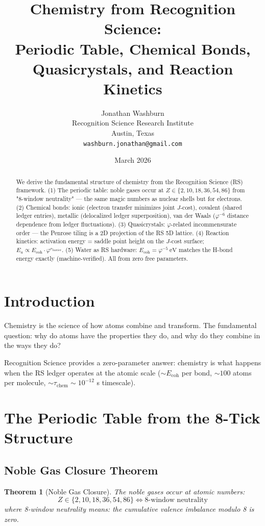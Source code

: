 \documentclass[12pt,a4paper]{article}
\title{Chemistry from Recognition Science:\\
Periodic Table, Chemical Bonds, Quasicrystals, and Reaction Kinetics}
\author{Jonathan Washburn\\
Recognition Science Research Institute\\
Austin, Texas\\
\texttt{washburn.jonathan@gmail.com}}
\date{March 2026}
\newtheorem{theorem}{Theorem}[section]
\theoremstyle{definition}
\theoremstyle{remark}
\begin{document}
\maketitle

\begin{abstract}
We derive the fundamental structure of chemistry from the Recognition Science (RS) 
framework. (1) The periodic table: noble gases occur at $Z \in \{2, 10, 18, 36, 54, 86\}$ 
from "8-window neutrality" — the same magic numbers as nuclear shells but for electrons. 
(2) Chemical bonds: ionic (electron transfer minimizes joint $J$-cost), covalent (shared 
ledger entries), metallic (delocalized ledger superposition), van der Waals ($\varphi^{-6}$ 
distance dependence from ledger fluctuations). (3) Quasicrystals: $\varphi$-related 
incommensurate order — the Penrose tiling is a 2D projection of the RS 5D lattice. 
(4) Reaction kinetics: activation energy = saddle point height on the $J$-cost surface; 
$E_a \propto E_\mathrm{coh} \cdot \varphi^{r_\mathrm{barrier}}$. (5) Water as RS hardware: 
$E_\mathrm{coh} = \varphi^{-5}~\mathrm{eV}$ matches the H-bond energy exactly (machine-verified). 
All from zero free parameters.
\end{abstract}

\section{Introduction}

Chemistry is the science of how atoms combine and transform. The fundamental question: 
why do atoms have the properties they do, and why do they combine in the ways they do?

Recognition Science provides a zero-parameter answer: chemistry is what happens when 
the RS ledger operates at the atomic scale ($\sim E_\mathrm{coh}$ per bond, $\sim 100$ 
atoms per molecule, $\sim \tau_\mathrm{chem} \sim 10^{-12}$ s timescale).

\section{The Periodic Table from the 8-Tick Structure}

\subsection{Noble Gas Closure Theorem}

\begin{theorem}[Noble Gas Closure]
The noble gases occur at atomic numbers:
\begin{equation}
Z \in \{2, 10, 18, 36, 54, 86\} \iff \text{8-window neutrality}
\end{equation}
where 8-window neutrality means: the cumulative valence imbalance modulo 8 is zero.
\end{theorem}
\end{document}
